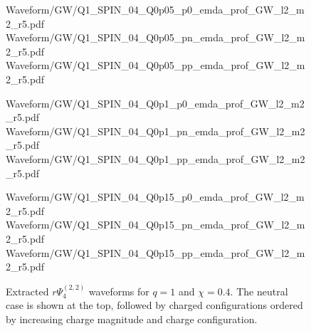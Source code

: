 \begin{figure}[p]
\centering
{}

\vspace{0.6em}

{Waveform/GW/Q1_SPIN_04_Q0p05_p0_emda_prof_GW_l2_m2_r5.pdf}
\hfill
{}
{Waveform/GW/Q1_SPIN_04_Q0p05_pn_emda_prof_GW_l2_m2_r5.pdf}
\hfill
{}
{Waveform/GW/Q1_SPIN_04_Q0p05_pp_emda_prof_GW_l2_m2_r5.pdf}

\vspace{0.6em}

{Waveform/GW/Q1_SPIN_04_Q0p1_p0_emda_prof_GW_l2_m2_r5.pdf}
\hfill
{}
{Waveform/GW/Q1_SPIN_04_Q0p1_pn_emda_prof_GW_l2_m2_r5.pdf}
\hfill
{}
{Waveform/GW/Q1_SPIN_04_Q0p1_pp_emda_prof_GW_l2_m2_r5.pdf}

\vspace{0.6em}

{Waveform/GW/Q1_SPIN_04_Q0p15_p0_emda_prof_GW_l2_m2_r5.pdf}
\hfill
{}
{Waveform/GW/Q1_SPIN_04_Q0p15_pn_emda_prof_GW_l2_m2_r5.pdf}
\hfill
{}
{Waveform/GW/Q1_SPIN_04_Q0p15_pp_emda_prof_GW_l2_m2_r5.pdf}

\caption[Gravitational-wave catalog for $q=1$, $\chi=0.4$]{
Extracted $r\Psi_4^{(2,2)}$ waveforms for $q=1$ and $\chi=0.4$. The neutral case is shown at the top, followed by charged configurations ordered by increasing charge magnitude and charge configuration.
}
\label{fig:gw_catalog_q1_chi04}
\end{figure}

